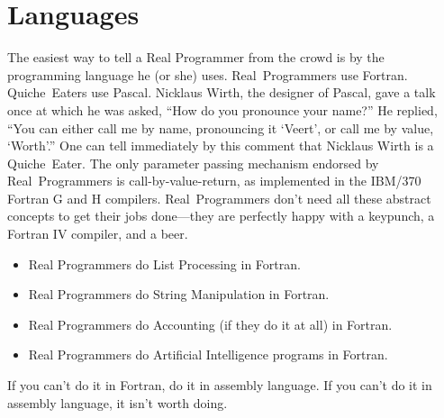 \documentclass[10pt,letterpaper]{article}
\newcommand{\acro}[1]{{\small #1\spacefactor1000}}
\begin{document}
\section*{Languages}
The easiest way to tell a Real Programmer from the crowd is by the
programming language he (or she) uses. Real~Programmers use
Fortran. Quiche~Eaters use Pascal. Nicklaus Wirth, the designer of
Pascal, gave a talk once at which he was asked, ``How do you pronounce
your name?'' He replied, ``You can either call me by name, pronouncing
it `Veert', or call me by value, `Worth'.'' One can tell immediately by
this comment that Nicklaus Wirth is a Quiche~Eater. The only parameter
passing mechanism endorsed by Real~Programmers is
call-by-value-return, as implemented in the \acro{IBM}/370 Fortran \acro{G} and \acro{H}
compilers. Real~Programmers don't need all these abstract concepts to
get their jobs done---they are perfectly happy with a keypunch, a
Fortran \acro{IV} compiler, and a beer.

\begin{itemize}
\item Real Programmers do List Processing in Fortran.
\item Real Programmers do String Manipulation in Fortran.
\item Real Programmers do Accounting (if they do it at all) in Fortran.
\item Real Programmers do Artificial Intelligence programs in Fortran.
\end{itemize}
If you can't do it in Fortran, do it in assembly language. If you
can't do it in assembly language, it isn't worth doing.
\end{document}
